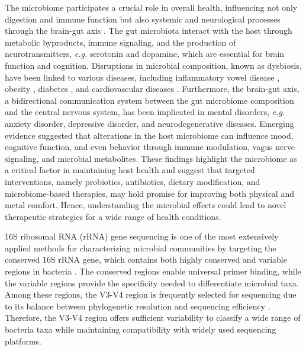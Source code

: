 \documentclass[11pt, a4paper, onecolumn, oneside]{report}
\begin{document}
        The microbiome participates a crucial role in overall health, influencing not only digestion and immune function but also systemic and neurological processes through the brain-gut axis \cite{brain-gut-1, brain-gut-2, brain-gut-3}. The gut microbiota interact with the host through metabolic byproducts, immune signaling, and the production of neurotransmitters, \textit{e.g.} serotonin and dopamine, which are essential for brain function and cognition. Disruptions in microbial composition, known as dysbiosis, have been linked to various diseases, including inflammatory vowel disease \cite{dysbiosis-inflammatory-1, dysbiosis-inflammatory-2}, obesity \cite{dysbiosis-obesity-1, dysbiosis-obesity-2, dysbiosis-obesity-3}, diabetes \cite{dysbiosis-diabetes-1, dysbiosis-diabetes-2, dysbiosis-diabetes-3}, and cardiovascular diseases \cite{dysbiosis-cardio-2, dysbiosis-cardio-3}. Furthermore, the brain-gut axis, a bidirectional communication system between the gut microbiome composition and the central nervous system, has been implicated in mental disorders, \textit{e.g.} anxiety disorder, depressive disorder, and neurodegenerative diseases. Emerging evidence suggested that alterations in the host microbiome can influence mood, cognitive function, and even behavior through immune modulation, vagus nerve signaling, and microbial metabolites. These findings highlight the microbiome as a critical factor in maintaining host health and suggest that targeted interventions, namely probiotics, antibiotics, dietary modification, and microbiome-based therapies, may hold promise for improving both physical and metal comfort. Hence, understanding the microbial effects could lead to novel therapeutic strategies for a wide range of health conditions.

        16S ribosomal RNA (rRNA) gene sequencing is one of the most extensively applied methods for characterizing microbial communities by targeting the conserved 16S rRNA gene, which contains both highly conserved and variable regions in bacteria \cite{16S-1, 16S-2}. The conserved regions enable universal primer binding, while the variable regions provide the specificity needed to differentiate microbial taxa. Among these regions, the V3-V4 region is frequently selected for sequencing due to its balance between phylogenetic resolution and sequencing efficiency \cite{16S-3, 16S-4}. Therefore, the V3-V4 region offers sufficient variability to classify a wide range of bacteria taxa while maintaining compatibility with widely used sequencing platforms.
\end{document}
